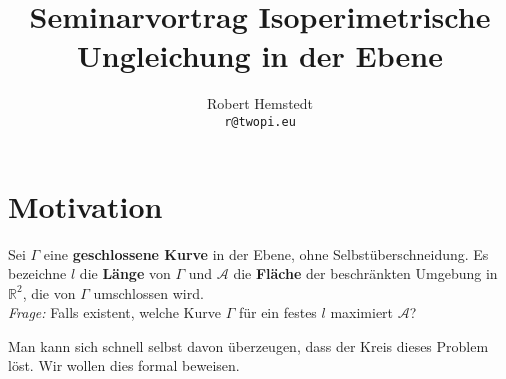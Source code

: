 \documentclass[12pt,a4paper]{article}
\author{Robert Hemstedt \\ \texttt{r@twopi.eu}}
\title{Seminarvortrag Isoperimetrische Ungleichung in der Ebene}
\theoremstyle{plain}
\newcommand{\R}{\mathbb{R}}
\numberwithin{equation}{section}
\begin{document}
\maketitle
\section{Motivation}
Sei $\Gamma$ eine \textbf{geschlossene Kurve} in der Ebene, ohne Selbstüberschneidung. Es bezeichne $l$ die \textbf{Länge} von $\Gamma$ und $\mathcal{A}$ die \textbf{Fläche} der beschränkten Umgebung in $\R^2$, die von $\Gamma$ umschlossen wird.\\
\textit{Frage:} Falls existent, welche Kurve $\Gamma$ für ein festes $l$ maximiert $\mathcal{A}$?

Man kann sich schnell selbst davon überzeugen, dass der Kreis dieses Problem löst.
Wir wollen dies formal beweisen.
\end{document}

